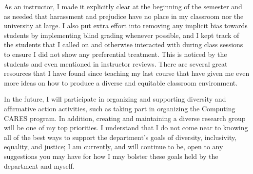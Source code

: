 As an instructor, I made it explicitly clear at the beginning of the semester and as needed that harassment and prejudice have no place in my classroom nor the university at large. I also put extra effort into removing any implicit bias towards students by implementing blind grading whenever possible, and I kept track of the students that I called on and otherwise interacted with during class sessions to ensure I did not show any preferential treatment. This is noticed by the students and even mentioned in instructor reviews. There are several great resources that I have found since teaching my last course that have given me even more ideas on how to produce a diverse and equitable classroom environment.

In the future, I will participate in organizing and supporting diversity and affirmative action activities, such as taking part in organizing the Computing CARES program. In addition, creating and maintaining a diverse research group will be one of my top priorities. I understand that I do not come near to knowing all of the best ways to support the department’s goals of diversity, inclusivity, equality, and justice; I am currently, and will continue to be, open to any suggestions you may have for how I may bolster these goals held by the department and myself.


\label{diversity_last}
